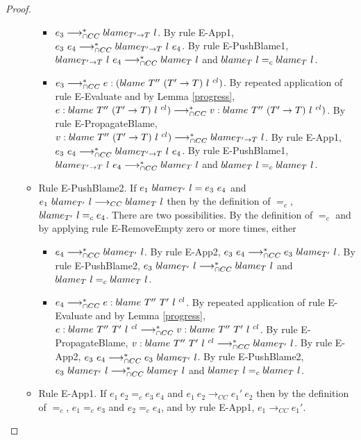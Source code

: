 \documentclass[a4paper]{article}
\begin{document}
\begin{proof}
\begin{itemize}
\begin{itemize}
        \begin{itemize}
            \item $e_3 \longrightarrow_{\cap CC}^* blame_{T' \rightarrow T}\ l$.
            By rule E-App1, $e_3\ e_4 \longrightarrow_{\cap CC}^* blame_{T' \rightarrow T}\ l\ e_4$.
            By rule E-PushBlame1, $blame_{T' \rightarrow T}\ l\ e_4 \longrightarrow_{\cap CC}^* blame_{T}\ l$ and $blame_{T}\ l =_c blame_{T}\ l$.
            \item $e_3 \longrightarrow_{\cap CC}^* e : (blame\ T''\ (T' \rightarrow T)\ l\ ^{cl})$.
            By repeated application of rule E-Evaluate and by Lemma \ref{progress}, $e : blame\ T''\ (T' \rightarrow T)\ l\ ^{cl}) \longrightarrow_{\cap CC}^* v : blame\ T''\ (T' \rightarrow T)\ l\ ^{cl})$.
            By rule E-PropagateBlame, $v : blame\ T''\ (T' \rightarrow T)\ l\ ^{cl}) \longrightarrow_{\cap CC}^* blame_{T' \rightarrow T}\ l$.
            By rule E-App1, $e_3\ e_4 \longrightarrow_{\cap CC}^* blame_{T' \rightarrow T}\ l\ e_4$.
            By rule E-PushBlame1, $blame_{T' \rightarrow T}\ l\ e_4 \longrightarrow_{\cap CC}^* blame_{T}\ l$ and $blame_{T}\ l =_c blame_{T}\ l$.
        \end{itemize}
        \item Rule E-PushBlame2.
        If $e_1\ \blame{T'}{l} = e_3\ e_4$ and $e_1\ \blame{T'}{l} \longrightarrow_{CC} \blame{T}{l}$ then by the definition of $=_c$, $blame_{T'}\ l =_c e_4$.
        There are two possibilities.
        By the definition of $=_c$ and by applying rule E-RemoveEmpty zero or more times, either
        \begin{itemize}
            \item $e_4 \longrightarrow_{\cap CC}^* blame_{T'}\ l$.
            By rule E-App2, $e_3\ e_4 \gios^* e_3\ \blame{T'}{l}$.
            By rule E-PushBlame2, $e_3\ blame_{T'}\ l \longrightarrow_{\cap CC}^* blame_{T}\ l$ and $blame_{T}\ l =_c blame_{T}\ l$.
            \item $e_4 \longrightarrow_{\cap CC}^* e : blame\ T''\ T'\ l\ ^{cl}$.
            By repeated application of rule E-Evaluate and by Lemma \ref{progress}, $e : blame\ T''\ T'\ l\ ^{cl} \longrightarrow_{\cap CC}^* v : blame\ T''\ T'\ l\ ^{cl}$.
            By rule E-PropagateBlame, $v : blame\ T''\ T'\ l\ ^{cl} \longrightarrow_{\cap CC}^* blame_{T'}\ l$.
            By rule E-App2, $e_3\ e_4 \gios^* e_3\ \blame{T'}{l}$.
            By rule E-PushBlame2, $e_3\ blame_{T'}\ l \longrightarrow_{\cap CC}^* blame_{T}\ l$ and $blame_{T}\ l =_c blame_{T}\ l$.
        \end{itemize}
        \item Rule E-App1.
        If $e_1\ e_2 =_c e_3\ e_4$ and $e_1\ e_2 \longrightarrow_{CC} e_1'\ e_2$ then by the definition of $=_c$, $e_1 =_c e_3$ and $e_2 =_c e_4$, and by rule E-App1, $e_1 \longrightarrow_{CC} e_1'$.

\end{itemize}
\end{itemize}
\end{proof}
\end{document}
